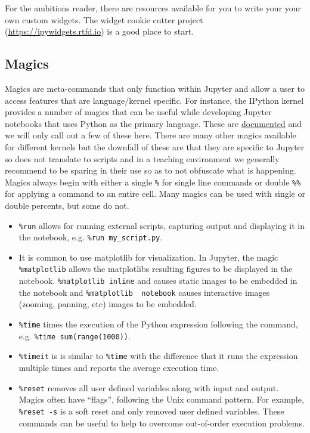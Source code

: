 \documentclass[]{book}
\begin{document}
For the ambitions reader, there are resources available for you to write
your your own custom widgets. The widget cookie cutter project
(\url{https://ipywidgets.rtfd.io}) is a good place to start.

\subsection{Magics}\label{magics}

Magics are meta-commands that only function within Jupyter and allow a
user to access features that are language/kernel specific. For instance,
the IPython kernel provides a number of magics that can be useful while
developing Jupyter notebooks that uses Python as the primary language.
These are
\href{https://ipython.readthedocs.io/en/stable/interactive/magics.html}{documented}
and we will only call out a few of these here. There are many other
magics available for different kernels but the downfall of these are
that they are specific to Jupyter so does not translate to scripts and
in a teaching environment we generally recommend to be sparing in their
use so as to not obfuscate what is happening. Magics always begin with
either a single \texttt{\%} for single line commands or double
\texttt{\%\%} for applying a command to an entire cell. Many magics can
be used with single or double percents, but some do not.

\begin{itemize}
\item
  \texttt{\%run} allows for running external scripts, capturing output
  and displaying it in the notebook, e.g. \texttt{\%run\ my\_script.py}.
\item
  It is common to use matplotlib for visualization. In Jupyter, the
  magic \texttt{\%matplotlib} allows the matplotlibs resulting figures
  to be displayed in the notebook. \texttt{\%matplotlib\ inline} and
  causes static images to be embedded in the notebook and
  \texttt{\%matplotlib\ \ notebook} causes interactive images (zooming,
  panning, etc) images to be embedded.
\item
  \texttt{\%time} times the execution of the Python expression following
  the command, e.g. \texttt{\%time\ sum(range(1000))}.
\item
  \texttt{\%timeit} is is similar to \texttt{\%time} with the difference
  that it runs the expression multiple times and reports the average
  execution time.
\item
  \texttt{\%reset} removes all user defined variables along with input
  and output. Magics often have ``flags'', following the Unix command
  pattern. For example, \texttt{\%reset\ -s} is a soft reset and only
  removed user defined variables. These commands can be useful to help
  to overcome out-of-order execution problems.
\end{itemize}
\end{document}
